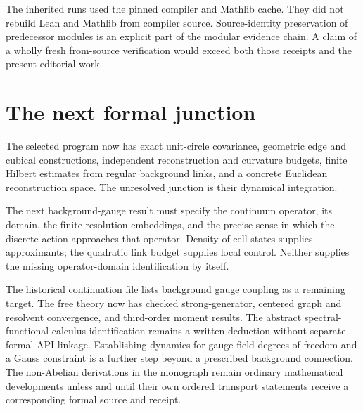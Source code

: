 The inherited runs used the pinned compiler and Mathlib cache. They did not rebuild Lean and Mathlib from compiler source. Source-identity preservation of predecessor modules is an explicit part of the modular evidence chain. A claim of a wholly fresh from-source verification would exceed both those receipts and the present editorial work.

\section{The next formal junction}

The selected program now has exact unit-circle covariance, geometric edge and cubical constructions, independent reconstruction and curvature budgets, finite Hilbert estimates from regular background links, and a concrete Euclidean reconstruction space. The unresolved junction is their dynamical integration.

The next background-gauge result must specify the continuum operator, its domain, the finite-resolution embeddings, and the precise sense in which the discrete action approaches that operator. Density of cell states supplies approximants; the quadratic link budget supplies local control. Neither supplies the missing operator-domain identification by itself.

The historical continuation file lists background gauge coupling as a remaining target. The free theory now has checked strong-generator, centered graph and resolvent convergence, and third-order moment results. The abstract spectral-functional-calculus identification remains a written deduction without separate formal API linkage. Establishing dynamics for gauge-field degrees of freedom and a Gauss constraint is a further step beyond a prescribed background connection. The non-Abelian derivations in the monograph remain ordinary mathematical developments unless and until their own ordered transport statements receive a corresponding formal source and receipt.
